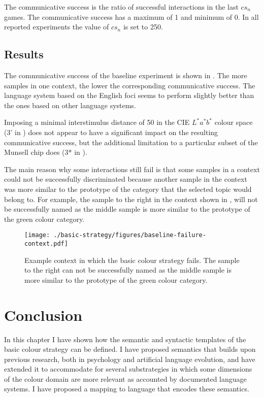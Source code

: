 The communicative success is
the ratio of
successful interactions in the last $cs_n$ games. The communicative
success has a maximum of 1 and minimum of 0. In all reported
experiments the value of $cs_n$ is set to 250.

\subsection{Results}

The communicative success of the baseline experiment is shown in
. The more samples in one
context, the lower the corresponding communicative success. The
language system based on the English foci seems to perform slightly
better than the ones based on other language systems.


Imposing a minimal interstimulus distance of 50 in the CIE $L^*a^*b^*$
colour space (3' in ) does not
appear to have a significant impact on the resulting communicative
success, but the additional limitation to a particular subset of the
Munsell chip does (3* in ).

The main reason why some interactions still fail is that some samples
in a context could not be successfully discriminated because another
sample in the context was more similar to the prototype of the
category that the selected topic would belong to. For example, the
sample to the right in the context shown in , will not be successfully named as
the middle sample is more similar to the prototype of the green colour
category.

\begin{figure}[H]
  \begin{center}
    \texttt{[image: ./basic-strategy/figures/baseline-failure-context.pdf]}
    \caption[Example context in which the basic colour strategy
    fails]{Example context in which the basic colour strategy
      fails. The sample to the right can not be successfully named as
      the middle sample is more similar to the prototype of the green
      colour category.}
    \label{f:bcs-failure-context}
  \end{center}
\end{figure}

\section{Conclusion}

In this chapter I have shown how the semantic and syntactic templates
of the basic colour strategy can be defined. I have proposed
semantics that builds upon previous research, both in psychology and
artificial language evolution, and have extended it to accommodate for
several substrategies in which some dimensions of the colour domain
are more relevant as accounted by documented language systems. I have
proposed a mapping to language that encodes these semantics.
